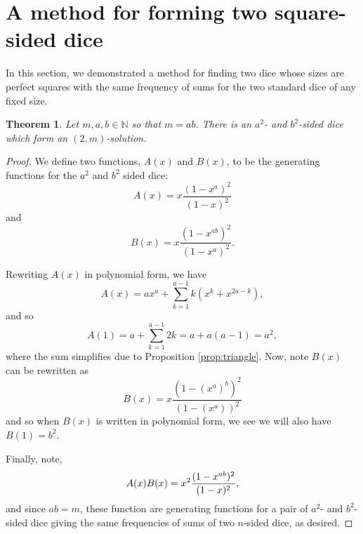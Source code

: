 \documentclass[11pt]{amsart}
\numberwithin{equation}{section}
\theoremstyle{plain}
\newtheorem{theorem}[equation]{Theorem}
\theoremstyle{definition}
\def\N{\mathbb N}
\begin{document}







\section{A method for forming two square-sided dice}\label{sec:form}

In this section, we demonstrated a method for finding two dice whose sizes are perfect squares with the same frequency of sums for the two standard dice of any fixed size.

\begin{theorem}\label{theorem:cs2n}
Let $m,a,b\in \N$ so that $m = ab$. There is an $a^2$- and $b^2$-sided dice which form an $(2,m)$-solution.
\end{theorem}


\begin{proof}
We define two functions, $A(x)$ and $B(x)$, to be the generating functions for the $a^2$ and $b^2$ sided dice: 
$$A(x)=x\frac{(1-x^a)^2}{(1-x)^2}$$ %
and 
$$B(x)=x\frac{(1-x^{ab})^2}{(1-x^a)^2}.$$

Rewriting $A(x)$ in polynomial form, we have 
$$A(x)=ax^a+\sum_{k=1}^{a-1}k(x^k+x^{2a-k}),$$
and so 
$$A(1)=a+\sum_{k=1}^{a-1}2k=a+a(a-1)=a^2,$$
where the sum simplifies due to Proposition \ref{prop:triangle}.
Now, note $B(x)$ can be rewritten as
$$B(x)=x\frac{(1-(x^a)^b)^2}{(1-(x^a))^2}$$
and so when $B(x)$ is written in polynomial form, we see we will also have $B(1)=b^2$. 

Finally, note, 
\[A(x)B(x)=x^2{(1-x^{ab})^2\over (1-x)^2},\]
and since $ab=m$, these function are generating functions for a pair of $a^2$- and $b^2$-sided dice giving the same frequencies of sums of two $n$-sided dice, as desired.

\end{proof}
\end{document}

